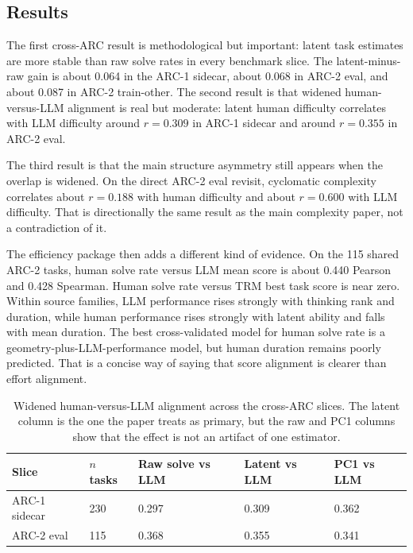 \documentclass[11pt,letterpaper]{article}
\begin{document}
\subsection{Results}

The first cross-ARC result is methodological but important: latent task estimates are more stable than raw solve rates in every benchmark slice. The latent-minus-raw gain is about 0.064 in the ARC-1 sidecar, about 0.068 in ARC-2 eval, and about 0.087 in ARC-2 train-other. The second result is that widened human-versus-LLM alignment is real but moderate: latent human difficulty correlates with LLM difficulty around $r = 0.309$ in ARC-1 sidecar and around $r = 0.355$ in ARC-2 eval.

The third result is that the main structure asymmetry still appears when the overlap is widened. On the direct ARC-2 eval revisit, cyclomatic complexity correlates about $r = 0.188$ with human difficulty and about $r = 0.600$ with LLM difficulty. That is directionally the same result as the main complexity paper, not a contradiction of it.

The efficiency package then adds a different kind of evidence. On the 115 shared ARC-2 tasks, human solve rate versus LLM mean score is about 0.440 Pearson and 0.428 Spearman. Human solve rate versus TRM best task score is near zero. Within source families, LLM performance rises strongly with thinking rank and duration, while human performance rises strongly with latent ability and falls with mean duration. The best cross-validated model for human solve rate is a geometry-plus-LLM-performance model, but human duration remains poorly predicted. That is a concise way of saying that score alignment is clearer than effort alignment.

\begin{table}[H]
\centering
\small
\caption{Widened human-versus-LLM alignment across the cross-ARC slices. The latent column is the one the paper treats as primary, but the raw and PC1 columns show that the effect is not an artifact of one estimator.}
\begin{tabular}{p{1.2in}p{0.8in}p{1.0in}p{1.0in}p{1.0in}}
\toprule
\textbf{Slice} & \textbf{$n$ tasks} & \textbf{Raw solve vs LLM} & \textbf{Latent vs LLM} & \textbf{PC1 vs LLM} \\
\midrule
ARC-1 sidecar & 230 & 0.297 & 0.309 & 0.362 \\
ARC-2 eval & 115 & 0.368 & 0.355 & 0.341 \\
\bottomrule
\end{tabular}
\end{table}
\end{document}
